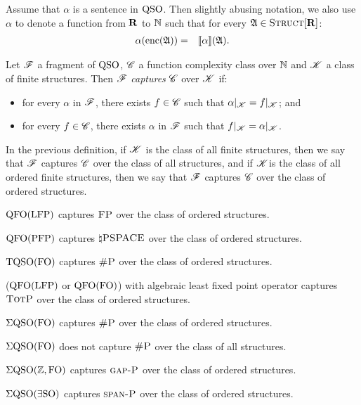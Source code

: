 
Assume that $\alpha$ is a sentence in ${\rm QSO}$. Then slightly abusing notation, we also use $\alpha$ to denote a function from $\mathbf{R}$ to $\mathbb{N}$ such that for every $\mathfrak{A} \in \text{\sc Struct}[\mathbf{R}] $:
\begin{eqnarray*}
	\alpha({\rm enc}(\mathfrak{A})) & = & {\llbracket{}{\alpha}\rrbracket}(\mathfrak{A}).
\end{eqnarray*}
\begin{definition}
	Let $\mathscr{F}$ a fragment of ${\rm QSO}$, $\mathscr{C}$ a function complexity class over $\mathbb{N}$ and $\mathscr{K}$ a class of finite structures. Then $\mathscr{F}$ {\em captures} $\mathscr{C}$ over $\mathscr{K}$ if:
	\begin{itemize}
		\item for every $\alpha$ in $\mathscr{F}$, there exists $f \in \mathscr{C}$ such that $\alpha|_{\mathscr{K}} = f|_{\mathscr{K}}$; and
		
		\item for every $f \in \mathscr{C}$, there exists $\alpha$ in $\mathscr{F}$ such that $f|_{\mathscr{K}} = \alpha|_{\mathscr{K}}$.
	\end{itemize}
\end{definition}
In the previous definition, if $\mathscr{K}$ is the class of all finite structures, then we say that $\mathscr{F}$ captures $\mathscr{C}$ over the class of all structures, and if $\mathscr{K}$is the class of all ordered finite structures, then we say that $\mathscr{F}$ captures $\mathscr{C}$ over the class of ordered structures.

\begin{theorem} \label{captfp}
	${\rm QFO}({\rm LFP})$ captures $\text{\sc FP}$ over the class of ordered structures.
\end{theorem}

\begin{theorem}
	${\rm QFO}({\rm PFP})$ captures $\natural\text{\sc PSPACE}$ over the class of ordered structures.
\end{theorem}

\begin{theorem}
	${\rm TQSO}({\rm FO})$ captures $\text{\sc \#P}$ over the class of ordered structures.
\end{theorem}

\begin{theorem}
	(${\rm QFO}({\rm LFP})$ or ${\rm QFO}({\rm FO})$) with algebraic least fixed point operator captures $\text{\sc TotP}$ over the class of ordered structures.
\end{theorem}


\begin{theorem}
	$\Sigma{\rm QSO}({\rm FO})$ captures $\text{\sc \#P}$ over the class of ordered structures.
\end{theorem}

\begin{proposition}
	$\Sigma{\rm QSO}({\rm FO})$ does not capture $\text{\sc \#P}$ over the class of all structures.
\end{proposition}

\begin{theorem}
	$\Sigma{\rm QSO}(\mathbb{Z},{\rm FO})$ captures $\text{\sc gap-P}$ over the class of ordered structures.
\end{theorem}


\begin{theorem}
	$\Sigma{\rm QSO}(\exists{\rm SO})$ captures $\text{\sc span-P}$ over the class of ordered structures.
\end{theorem}
